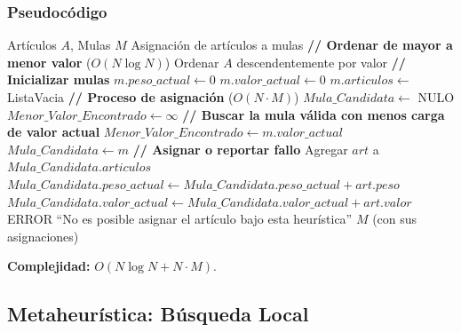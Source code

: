 \documentclass[12pt, a4paper]{article}
\begin{document}
    \subsubsection{Pseudocódigo}
    \begin{algorithm}[H]
        \caption{Heurística Voraz (Greedy)}
        \begin{algorithmic}[1]
            \Require Artículos $A$, Mulas $M$
            \Ensure Asignación de artículos a mulas
            \State \textbf{// Ordenar de mayor a menor valor} ($O(N \log N)$)
            \State Ordenar $A$ descendentemente por valor
            \State
            \State \textbf{// Inicializar mulas}
                \State $m.peso\_actual \gets 0$
                \State $m.valor\_actual \gets 0$
                \State $m.articulos \gets$ ListaVacia
            \EndFor
            \State
            \State \textbf{// Proceso de asignación} ($O(N \cdot M)$)
                \State $Mula\_Candidata \gets$ NULO
                \State $Menor\_Valor\_Encontrado \gets \infty$
                \State
                \State \textbf{// Buscar la mula válida con menos carga de valor actual}
                            \State $Menor\_Valor\_Encontrado \gets m.valor\_actual$
                            \State $Mula\_Candidata \gets m$
                        \EndIf
                    \EndIf
                \EndFor
                \State
                \State \textbf{// Asignar o reportar fallo}
                    \State Agregar $art$ a $Mula\_Candidata.articulos$
                    \State $Mula\_Candidata.peso\_actual \gets Mula\_Candidata.peso\_actual + art.peso$
                    \State $Mula\_Candidata.valor\_actual \gets Mula\_Candidata.valor\_actual + art.valor$
                \Else
                    \State \Return ERROR ``No es posible asignar el artículo bajo esta heurística''
                \EndIf
            \EndFor
            \State
            \State \Return $M$ (con sus asignaciones)
        \end{algorithmic}
    \end{algorithm}
    \textbf{Complejidad:} $O(N \log N + N \cdot M)$.

    \subsection{Metaheurística: Búsqueda Local}
\end{document}

